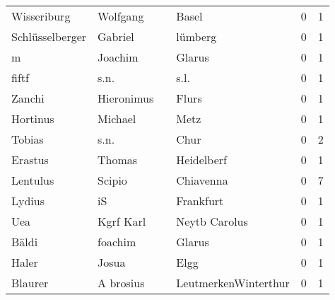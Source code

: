 \begin{center}
\begin{tiny}
\begin{longtabu}{llllrr}
              Wisseriburg &                           Wolfgang &             &                                       Basel &          0 &         1 \\
          Schlüsselberger &                            Gabriel &             &                                     lümberg &          0 &         1 \\
                        m &                            Joachim &             &                                      Glarus &          0 &         1 \\
                    fiftf &                               s.n. &             &                                        s.l. &          0 &         1 \\
                   Zanchi &                         Hieronimus &             &                                       Flurs &          0 &         1 \\
                 Hortinus &                            Michael &             &                                        Metz &          0 &         1 \\
                   Tobias &                               s.n. &             &                                        Chur &          0 &         2 \\
                  Erastus &                             Thomas &             &                                  Heidelberf &          0 &         1 \\
                 Lentulus &                             Scipio &             &                                   Chiavenna &          0 &         7 \\
                   Lydius &                                 iS &             &                                   Frankfurt &          0 &         1 \\
                      Uea &                          Kgrf Karl &             &                               Neytb Carolus &          0 &         1 \\
                    Bäldi &                            foachim &             &                                      Glarus &          0 &         1 \\
                    Haler &                              Josua &             &                                        Elgg &          0 &         1 \\
                  Blaurer &                          A brosius &             &                        LeutmerkenWinterthur &          0 &         1 \\

\end{longtabu}
\end{tiny}
\end{center}

